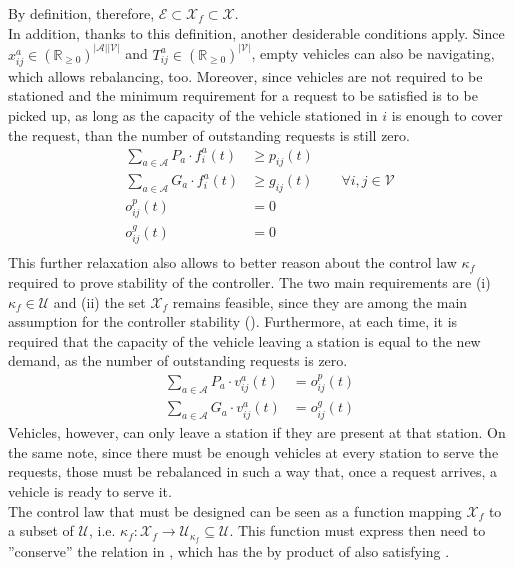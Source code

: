 By definition, therefore, $\mathcal{E} \subset \mathcal{X}_f \subset \mathcal{X}$. \\
In addition, thanks to this definition, another desiderable conditions apply. Since $ x_{ij}^a\in (\mathbb{R}_{\ge 0})^{|\mathcal{A}||\mathcal{V}|}$ and $T^a_{ij} \in (\mathbb{R}_{\ge 0})^{|\mathcal{V}|}$, empty vehicles can also be navigating, which allows rebalancing, too. Moreover, since vehicles are not required to be stationed and the minimum requirement for a request to be satisfied is to be picked up, as long as the capacity of the vehicle stationed in $i$ is enough to cover the request, than the number of outstanding requests is still zero. 
\begin{equation}
\begin{aligned}
	\sum_{a \in \mathcal{A}}  P_a\cdot f^a_{i}(t) &\ge p_{ij}(t) \\
	\sum_{a \in \mathcal{A}} G_a \cdot f^a_{i}(t) &\ge  g_{ij}(t) \quad\quad \forall i,j\in\mathcal{V}\\
	o^p_{ij}(t) &=0\\
	o^g_{ij}(t) &=0\\
\end{aligned}
\label{eq:conserved_rela}
\end{equation}
This further relaxation also allows to better reason about the control law $\kappa_f$ required to prove stability of the controller. The two main requirements are (i) $\kappa_f \in \mathcal{U}$ and (ii) the set $\mathcal{X}_f$ remains feasible, since they are among the main assumption for the controller stability (). Furthermore, 
at each time, it is required that the capacity of the vehicle leaving a station is equal to the new demand, as the number of outstanding requests is zero. 
\begin{equation}
	\begin{aligned}
		\sum_{a \in \mathcal{A}}  P_a\cdot v^a_{ij}(t) &=   o^p_{ij}(t) \\
		\sum_{a \in \mathcal{A}} G_a \cdot v^a_{ij}(t) &=   o^g_{ij}(t)
	\end{aligned}
	\label{eq:no_more_than_request_f}
\end{equation}
Vehicles, however, can only leave a station if they are present at that station. On the same note, since there must be enough vehicles at every station to serve the requests, those must be rebalanced in such a way that, once a request arrives, a vehicle is ready to serve it. \\
The control law that must be designed can be seen as a function mapping $\mathcal{X}_f$ to a subset of $\mathcal{U}$, i.e. $\kappa_f:\mathcal{X}_f \rightarrow\mathcal{U}_{\kappa_f} \subseteq \mathcal{U}$. This function must express then need to ''conserve'' the relation in , which has the by product of also satisfying .\\
